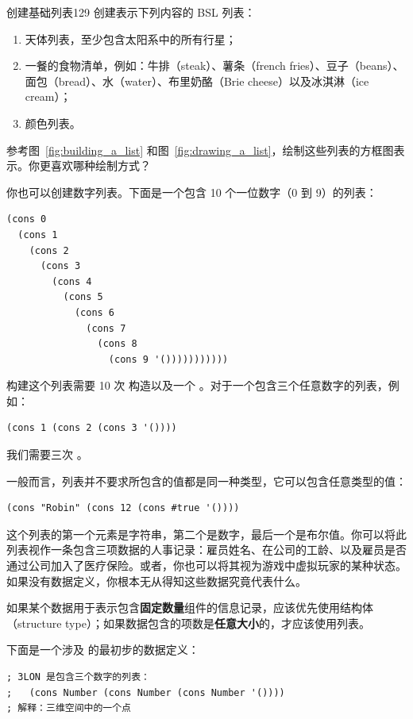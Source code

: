 \begin{exercise}{创建基础列表}{129}
创建表示下列内容的 BSL 列表：
\begin{enumerate}
  \item 天体列表，至少包含太阳系中的所有行星；
  \item 一餐的食物清单，例如：牛排（steak）、薯条（french fries）、豆子（beans）、面包（bread）、水（water）、布里奶酪（Brie cheese）以及冰淇淋（ice cream）；
  \item 颜色列表。
\end{enumerate}
参考图~\ref{fig:building_a_list} 和图~\ref{fig:drawing_a_list}，绘制这些列表的方框图表示。你更喜欢哪种绘制方式？
\end{exercise}

你也可以创建数字列表。下面是一个包含 10 个一位数字（0 到 9）的列表：
\begin{lstlisting}[language=BSL]
(cons 0
  (cons 1
    (cons 2
      (cons 3
        (cons 4
          (cons 5
            (cons 6
              (cons 7
                (cons 8
                  (cons 9 '()))))))))))
\end{lstlisting}

构建这个列表需要 10 次  构造以及一个 。对于一个包含三个任意数字的列表，例如：
\begin{lstlisting}[language=BSL]
(cons 1 (cons 2 (cons 3 '())))
\end{lstlisting}
我们需要三次 。

一般而言，列表并不要求所包含的值都是同一种类型，它可以包含任意类型的值：
\begin{lstlisting}[language=BSL]
(cons "Robin" (cons 12 (cons #true '())))
\end{lstlisting}

这个列表的第一个元素是字符串，第二个是数字，最后一个是布尔值。你可以将此列表视作一条包含三项数据的人事记录：雇员姓名、在公司的工龄、以及雇员是否通过公司加入了医疗保险。或者，你也可以将其视为游戏中虚拟玩家的某种状态。如果没有数据定义，你根本无从得知这些数据究竟代表什么。

\begin{notebox}[结构体 vs 列表]
如果某个数据用于表示包含\textbf{固定数量}组件的信息记录，应该优先使用结构体（structure type）；如果数据包含的项数是\textbf{任意大小}的，才应该使用列表。
\end{notebox}

下面是一个涉及  的最初步的数据定义：
\begin{lstlisting}[language=BSL]
; 3LON 是包含三个数字的列表：
;   (cons Number (cons Number (cons Number '())))
; 解释：三维空间中的一个点
\end{lstlisting}

